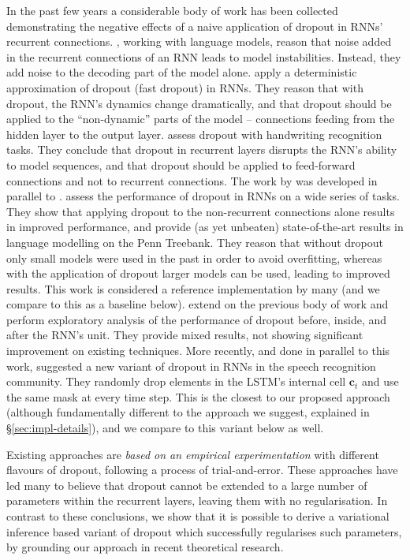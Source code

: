 \documentclass{article}
\renewcommand{\c}{\mathbf{c}}
\theoremstyle{definition}
\begin{document}
In the past few years a considerable body of work has been collected demonstrating the negative effects of a naive application of dropout in RNNs' recurrent connections.
\citet{pachitariu2013regularization}, working with language models, reason that noise added in the recurrent connections of an RNN leads to model instabilities. Instead, they add noise to the decoding part of the model alone.
\citet{bayer2013fast} apply a deterministic approximation of dropout (fast dropout) in RNNs. They reason that with dropout, the RNN's dynamics change dramatically, and that dropout should be applied to the ``non-dynamic'' parts of the model -- connections feeding from the hidden layer to the output layer.
\citet{pham2014dropout} assess dropout with handwriting recognition tasks. They conclude that dropout in recurrent layers disrupts the RNN's ability to model sequences, and that dropout should be applied to feed-forward connections and not to recurrent connections. 
The work by \citet*{zaremba2014recurrent} was developed in parallel to \citet{pham2014dropout}. \citet{zaremba2014recurrent} assess the performance of dropout in RNNs on a wide series of tasks. They show that applying dropout to the non-recurrent connections alone results in improved performance, and provide (as yet  unbeaten) state-of-the-art results in language modelling on the Penn Treebank. 
They reason that without dropout only small models were used in the past in order to avoid overfitting, whereas with the application of dropout larger models can be used, leading to improved results.
This work is considered a reference implementation by many (and we compare to this as a baseline below).
\citet{bluche2015apply} extend on the previous body of work and perform exploratory analysis of the performance of dropout before, inside, and after the RNN's unit. They provide mixed results, not showing significant improvement on existing techniques.
More recently, and done in parallel to this work, \citet{moon2015rnndrop} suggested a new variant of dropout in RNNs in the speech recognition community. They randomly drop elements in the LSTM's internal cell $\c_t$ and use the same mask at every time step. This is the closest to our proposed approach (although fundamentally different to the approach we suggest, explained in \S\ref{sec:impl-details}), and we compare to this variant below as well.

Existing approaches are \textit{based on an empirical experimentation} with different flavours of dropout, following a process of trial-and-error. These approaches have led many to believe that dropout cannot be extended to a large number of parameters within the recurrent layers, leaving them with no regularisation. 
In contrast to these conclusions, we show that it is possible to derive a variational inference based variant of dropout which successfully regularises such parameters, by grounding our approach in recent theoretical research.
\end{document}
